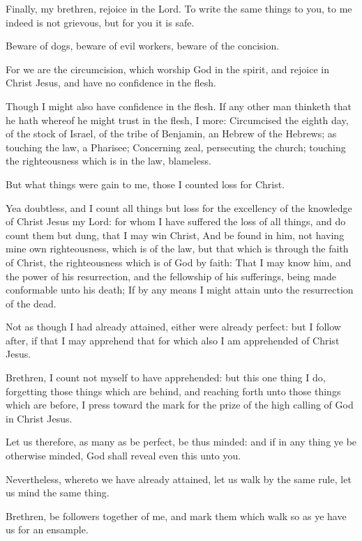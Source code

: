 \Chapter
\Verse Finally, my brethren, rejoice in the Lord. To write the same things to you, to me indeed is not grievous, but for you it is safe.

\Verse Beware of dogs, beware of evil workers, beware of the concision.

\Verse For we are the circumcision, which worship God in the spirit, and rejoice in Christ Jesus, and have no confidence in the flesh.

\Verse Though I might also have confidence in the flesh. If any other man thinketh that he hath whereof he might trust in the flesh, I more: \Verse Circumcised the eighth day, of the stock of Israel, of the tribe of Benjamin, an Hebrew of the Hebrews; as touching the law, a Pharisee; \Verse Concerning zeal, persecuting the church; touching the righteousness which is in the law, blameless.

\Verse But what things were gain to me, those I counted loss for Christ.

\Verse Yea doubtless, and I count all things but loss for the excellency of the knowledge of Christ Jesus my Lord: for whom I have suffered the loss of all things, and do count them but dung, that I may win Christ, \Verse And be found in him, not having mine own righteousness, which is of the law, but that which is through the faith of Christ, the righteousness which is of God by faith: \Verse That I may know him, and the power of his resurrection, and the fellowship of his sufferings, being made conformable unto his death; \Verse If by any means I might attain unto the resurrection of the dead.

\Verse Not as though I had already attained, either were already perfect: but I follow after, if that I may apprehend that for which also I am apprehended of Christ Jesus.

\Verse Brethren, I count not myself to have apprehended: but this one thing I do, forgetting those things which are behind, and reaching forth unto those things which are before, \Verse I press toward the mark for the prize of the high calling of God in Christ Jesus.

\Verse Let us therefore, as many as be perfect, be thus minded: and if in any thing ye be otherwise minded, God shall reveal even this unto you.

\Verse Nevertheless, whereto we have already attained, let us walk by the same rule, let us mind the same thing.

\Verse Brethren, be followers together of me, and mark them which walk so as ye have us for an ensample.

